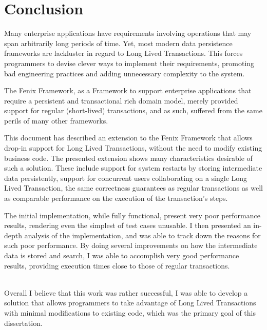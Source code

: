 \documentclass{llncs}
\begin{document}

\section{Conclusion}

Many enterprise applications have requirements involving operations
that may span arbitrarily long periods of time. Yet, most modern data
persistence frameworks are lackluster in regard to Long Lived
Transactions. This forces programmers to devise clever ways to
implement their requirements, promoting bad engineering practices and
adding unnecessary complexity to the system.

The Fenix Framework, as a Framework to support enterprise applications
that require a persistent and transactional rich domain model, merely
provided support for regular (short-lived) transactions, and as such,
suffered from the same perils of many other frameworks.

This document has described an extension to the Fenix Framework that
allows drop-in support for Long Lived Transactions, without the need
to modify existing business code. The presented extension shows
many characteristics desirable of such a solution. These include
support for system restarts by storing intermediate data persistently,
support for concurrent users collaborating on a single Long Lived
Transaction, the same correctness guarantees as regular transactions
as well as comparable performance on the execution of the
transaction's steps.

The initial implementation, while fully functional, present very poor
performance results, rendering even the simplest of test cases
unusable. I then presented an in-depth analysis of the implementation,
and was able to track down the reasons for such poor performance. By
doing several improvements on how the intermediate data is stored and
search, I was able to accomplish very good performance results,
providing execution times close to those of regular transactions.

~\\

Overall I believe that this work was rather successful, I was able to
develop a solution that allows programmers to take advantage of Long
Lived Transactions with minimal modifications to existing code, which
was the primary goal of this dissertation.

 
\end{document}
